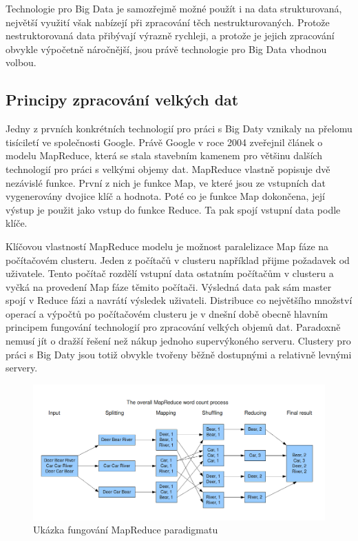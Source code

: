 \documentclass[thesis=B,czech]{FITthesis}[2012/06/26]
\begin{document}
	Technologie pro Big Data je samozřejmě možné použít i na data strukturovaná, největší využití však nabízejí při zpracování těch nestrukturovaných. Protože nestruktorovaná data přibývají výrazně rychleji\cite{structured-unstructured}, a protože je jejich zpracování obvykle výpočetně náročnější, jsou právě technologie pro Big Data vhodnou volbou. 
 
	
\subsection{Principy zpracování velkých dat}
	Jedny z prvních konkrétních technologií pro práci s Big Daty vznikaly na přelomu tisíciletí ve společnosti Google. Právě Google v roce 2004 zveřejnil článek o modelu MapReduce\cite{mapreduce-google}, která se stala stavebním kamenem pro většinu dalších technologií pro práci s velkými objemy dat. MapReduce vlastně popisuje dvě nezávislé funkce. První z nich je funkce Map, ve které jsou ze vstupních dat vygenerovány dvojice klíč a hodnota. Poté co je funkce Map dokončena, její výstup je použit jako vstup do funkce Reduce. Ta pak spojí vstupní data podle klíče\cite{mapreduce-description}. 
	
	Klíčovou vlastností MapReduce modelu je možnost paralelizace Map fáze na počítačovém clusteru. Jeden z počítačů v clusteru například přijme požadavek od uživatele. Tento počítač rozdělí vstupní data ostatním počítačům v clusteru a vyčká na provedení Map fáze těmito počítači. Výsledná data pak sám master spojí v Reduce fázi a navrátí výsledek uživateli. Distribuce co největšího množství operací a výpočtů po počítačovém clusteru je v dnešní době obecně hlavním principem fungování technologií pro zpracování velkých objemů dat. Paradoxně nemusí jít o dražší řešení než nákup jednoho supervýkoného serveru. Clustery pro práci s Big Daty jsou totiž obvykle tvořeny běžně dostupnými a relativně levnými servery. 
	
	\begin{figure}[ht]
    	\centering
    	\includegraphics[width=1\textwidth]{images/mapreduce.png}
    	\caption{Ukázka fungování MapReduce paradigmatu \cite{mapreduce-img} }
    	\label{fig:mapreduce}
	\end{figure}
	
\end{document}
